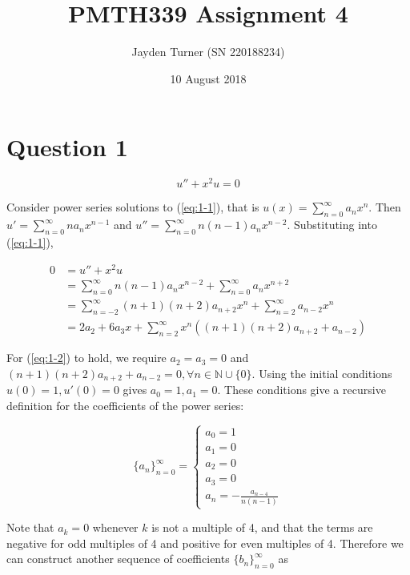 \documentclass{article}
\title{PMTH339 Assignment 4}
\date{10 August 2018}
\author{Jayden Turner (SN 220188234)}
\begin{document}
\maketitle
{}

\section*{Question 1}

\begin{equation} \label{eq:1-1}
    u'' + x^2u = 0
\end{equation}

Consider power series solutions to (\ref{eq:1-1}), that is $u(x) = \sum\limits_{n = 0}^\infty a_nx^n$. Then
$u' = \sum\limits_{n = 0}^\infty na_nx^{n - 1}$ and $u'' = \sum\limits_{n = 0}^\infty n(n - 1)a_nx^{n - 2}$. Substituting
into (\ref{eq:1-1}),

\begin{align}
    0 &= u'' + x^2u\nonumber\\
    &= \sum_{n = 0}^\infty n(n - 1)a_nx^{n - 2} + \sum_{n = 0}^\infty a_nx^{n + 2}\nonumber\\
    &= \sum_{n = -2}^\infty (n + 1)(n + 2)a_{n + 2}x^{n} + \sum_{n = 2}^\infty a_{n - 2}x^{n}\nonumber\\
    &= 2a_2 + 6a_3x + \sum_{n = 2}^\infty x^n((n + 1)(n + 2)a_{n + 2} + a_{n - 2}) \label{eq:1-2}
\end{align}

For (\ref{eq:1-2}) to hold, we require $a_2 = a_3 = 0$ and $(n + 1)(n + 2)a_{n + 2} + a_{n - 2} = 0, \forall n \in \mathbb{N} \cup \{0\}$.
Using the initial conditions $u(0) = 1, u'(0) = 0$ gives $a_0 = 1, a_1 = 0$. These conditions give a recursive definition for the
coefficients of the power series:

\begin{equation} \label{eq:1-3}
    \{a_n\}_{n = 0}^\infty = \begin{cases}
        a_0 = 1\\
        a_1 = 0\\
        a_2 = 0\\
        a_3 = 0\\
        a_n = -\frac{a_{n - 4}}{n(n - 1)}
    \end{cases}
\end{equation}

Note that $a_k = 0$ whenever $k$ is not a multiple of 4, and that the terms are negative for odd multiples of 4
and positive for even multiples of 4. Therefore we can construct another sequence of coefficients $\{b_n\}_{n = 0}^\infty$ as
\end{document}
